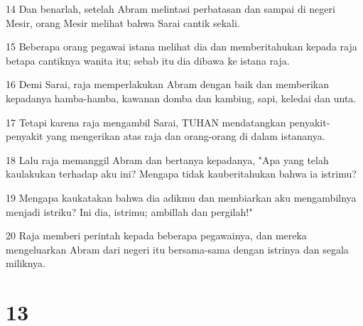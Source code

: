 \par 14 Dan benarlah, setelah Abram melintasi perbatasan dan sampai di negeri Mesir, orang Mesir melihat bahwa Sarai cantik sekali.
\par 15 Beberapa orang pegawai istana melihat dia dan memberitahukan kepada raja betapa cantiknya wanita itu; sebab itu dia dibawa ke istana raja.
\par 16 Demi Sarai, raja memperlakukan Abram dengan baik dan memberikan kepadanya hamba-hamba, kawanan domba dan kambing, sapi, keledai dan unta.
\par 17 Tetapi karena raja mengambil Sarai, TUHAN mendatangkan penyakit-penyakit yang mengerikan atas raja dan orang-orang di dalam istananya.
\par 18 Lalu raja memanggil Abram dan bertanya kepadanya, "Apa yang telah kaulakukan terhadap aku ini? Mengapa tidak kauberitahukan bahwa ia istrimu?
\par 19 Mengapa kaukatakan bahwa dia adikmu dan membiarkan aku mengambilnya menjadi istriku? Ini dia, istrimu; ambillah dan pergilah!"
\par 20 Raja memberi perintah kepada beberapa pegawainya, dan mereka mengeluarkan Abram dari negeri itu bersama-sama dengan istrinya dan segala miliknya.

\chapter{13}


